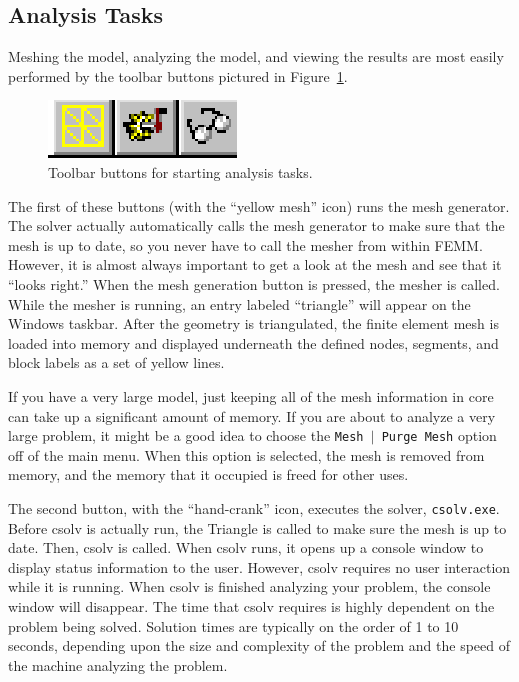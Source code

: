 \subsection{Analysis Tasks}

Meshing the model, analyzing the model, and viewing the results are
most easily performed by the toolbar buttons pictured in
Figure~\ref{cfig13}.

\begin{figure}[htbp]
\centerline{\includegraphics{belaman13.eps}}
\caption{Toolbar buttons for starting analysis tasks.}
\label{cfig13}
\end{figure}

The first of these buttons (with the ``yellow mesh'' icon) runs the
mesh generator. The solver actually automatically calls the mesh
generator to make sure that the mesh is up to date, so you never
have to call the mesher from within FEMM. However, it is almost
always important to get a look at the mesh and see that it ``looks
right.'' When the mesh generation button is pressed, the mesher is
called. While the mesher is running, an entry labeled ``triangle''
will appear on the Windows taskbar. After the geometry is
triangulated, the finite element mesh is loaded into memory and
displayed underneath the defined nodes, segments, and block labels
as a set of yellow lines.

If you have a very large model, just keeping all of the mesh
information in core can take up a significant amount of memory. If
you are about to analyze a very large problem, it might be a good
idea to choose the \texttt{Mesh $\vert $ Purge Mesh} option off of
the main menu. When this option is selected, the mesh is removed
from memory, and the memory that it occupied is freed for other
uses.

The second button, with the ``hand-crank'' icon, executes the solver,
\texttt{csolv.exe}. Before csolv is actually run, the Triangle is
called to make sure the mesh is up to date. Then, csolv is called. When
csolv runs, it opens up a console window to display status information
to the user. However, csolv requires no user interaction while it is
running. When csolv is finished analyzing your problem, the console
window will disappear. The time that csolv requires is highly dependent
on the problem being solved. Solution times are typically on the order of 1
to 10 seconds, depending upon the size and complexity of the problem and the
speed of the machine analyzing the problem.

